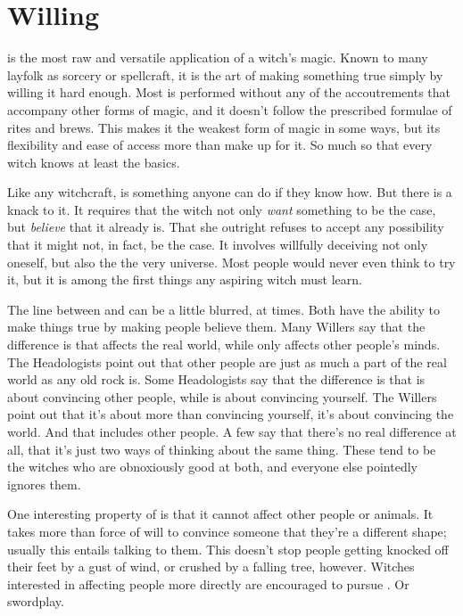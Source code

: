 \chapter{Willing}

 is the most raw and versatile application of a witch's magic.
Known to many layfolk as sorcery or spellcraft, it is the art of making something true simply by willing it hard enough.
Most  is performed without any of the accoutrements that accompany other forms of magic, and it doesn't follow the prescribed formulae of rites and brews.
This makes it the weakest form of magic in some ways, but its flexibility and ease of access more than make up for it.
So much so that every witch knows at least the basics.

Like any witchcraft,  is something anyone can do if they know how.
But there is a knack to it.
It requires that the witch not only \emph{want} something to be the case, but \emph{believe} that it already is.
That she outright refuses to accept any possibility that it might not, in fact, be the case.
It involves willfully deceiving not only oneself, but also the the very universe.
Most people would never even think to try it, but it is among the first things any aspiring witch must learn.

The line between  and  can be a little blurred, at times.
Both have the ability to make things true by making people believe them.
Many Willers say that the difference is that  affects the real world, while  only affects other people's minds.
The Headologists point out that other people are just as much a part of the real world as any old rock is.
Some Headologists say that the difference is that  is about convincing other people, while  is about convincing yourself.
The Willers point out that it's about more than convincing yourself, it's about convincing the world.
And that includes other people.
A few say that there's no real difference at all, that it's just two ways of thinking about the same thing.
These tend to be the witches who are obnoxiously good at both, and everyone else pointedly ignores them.

One interesting property of  is that it cannot affect other people or animals.
It takes more than force of will to convince someone that they're a different shape; usually this entails talking to them.
This doesn't stop people getting knocked off their feet by a gust of wind, or crushed by a falling tree, however.
Witches interested in affecting people more directly are encouraged to pursue .
Or swordplay.

